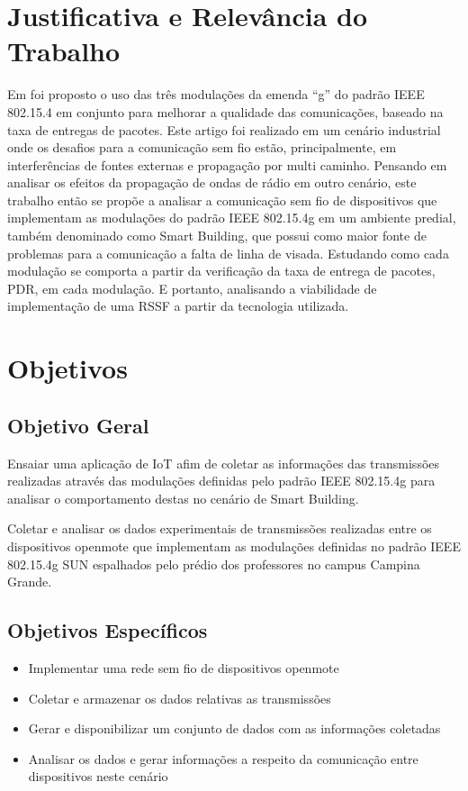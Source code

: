 \section{Justificativa e Relevância do Trabalho}
\label{sec:justificativa}
Em \cite{tuset2020reliability} foi proposto o uso das três modulações da emenda ``g'' do padrão IEEE 802.15.4 em conjunto para melhorar a qualidade das comunicações, baseado na taxa de entregas de pacotes. Este artigo foi realizado em um cenário industrial onde os desafios para a comunicação sem fio estão, principalmente, em interferências de fontes externas e propagação por multi caminho. Pensando em analisar os efeitos da propagação de ondas de rádio em outro cenário, este trabalho então se propõe a analisar a comunicação sem fio de dispositivos que implementam as modulações do padrão IEEE 802.15.4g em um ambiente predial, também denominado como Smart Building, que possui como maior fonte de problemas para a comunicação a falta de linha de visada. Estudando como cada modulação se comporta a partir da verificação da taxa de entrega de pacotes, PDR, em cada modulação. E portanto, analisando a viabilidade de implementação de uma RSSF a partir da tecnologia utilizada.

\section{Objetivos}
\label{sec:objetivos}

\subsection{Objetivo Geral}
\label{subsec:objGeral}
Ensaiar uma aplicação de IoT afim de coletar as informações das transmissões realizadas através das modulações definidas pelo padrão IEEE 802.15.4g para analisar o comportamento destas no cenário de Smart Building.

Coletar e analisar os dados experimentais de transmissões realizadas entre os dispositivos openmote que implementam as modulações definidas no padrão IEEE 802.15.4g SUN espalhados pelo prédio dos professores no campus Campina Grande.

\subsection{Objetivos Específicos}
\label{subsec:objespecificos}
\begin{itemize}
    \item Implementar uma rede sem fio de dispositivos openmote
    \item Coletar e armazenar os dados relativas as transmissões
    \item Gerar e disponibilizar um conjunto de dados com as informações coletadas
    \item Analisar os dados e gerar informações a respeito da comunicação entre dispositivos neste cenário
\end{itemize}


